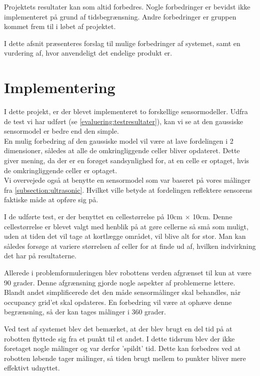 Projektets resultater kan som altid forbedres.
Nogle forbedringer er bevidst ikke implementeret på grund af tidsbegrænsning. 
Andre forbedringer er gruppen kommet frem til i løbet af projektet.

I dette afsnit præsenteres forslag til mulige forbedringer af systemet, samt en vurdering af, hvor anvendeligt det endelige produkt er.

\section{Implementering}
I dette projekt, er der blevet implementeret to forskellige sensormodeller. 
Udfra de test vi har udført (se \cref{evaluering:testresultater}), kan vi se at den gaussiske sensormodel er bedre end den simple. \\
En mulig forbedring af den gaussiske model vil være at lave fordelingen i 2 dimensioner, således at alle de omkringliggende celler bliver opdateret. 
Dette giver mening, da der er en forøget sandsynlighed for, at en celle er optaget, hvis de omkringliggende celler er optaget. \\
Vi overvejede også at benytte en sensormodel som var baseret på vores målinger fra \cref{subsection:ultrasonic}.
Hvilket ville betyde at fordelingen reflektere sensorens faktiske måde at opføre sig på.

I de udførte test, er der benyttet en cellestørrelse på 10cm $ \times $ 10cm.
Denne cellestørrelse er blevet valgt med henblik på at gøre cellerne så små som muligt, uden at tiden det vil tage at kortlægge området, vil blive alt for stor.
Man kan således forsøge at variere størrelsen af celler for at finde ud af, hvilken indvirkning det har på resultaterne.

Allerede i problemformuleringen blev robottens verden afgrænset til kun at være 90 grader. 
Denne afgrænsning gjorde nogle aspekter af problemerne lettere. 
Blandt andet simplificerede det den måde sensormålinger skal behandles, når occupancy grid'et skal opdateres.
En forbedring vil være at ophæve denne begrænsning, så der kan tages målinger i 360 grader.

Ved test af systemet blev det bemærket, at der blev brugt en del tid på at robotten flyttede sig fra et punkt til et andet.
I dette tidsrum blev der ikke foretaget nogle målinger og var derfor 'spildt' tid. 
Dette kan forbedres ved at robotten løbende tager målinger, så tiden brugt mellem to punkter bliver mere effektivt udnyttet.

